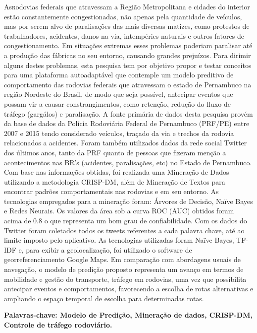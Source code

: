 \vspace*{12pt}

\lettrine {As} rodovias federais que atravessam a Região
Metropolitana e cidades do interior estão constantemente
congestionadas, não apenas pela quantidade de veículos,
mas por serem alvo de paralisações das mais diversas
matizes, como protestos de trabalhadores, acidentes,
danos na via, intempéries naturais e outros fatores de
congestionamento. Em situações extremas esses problemas
poderiam paralisar até a produção das fábricas no seu
entorno, causando grandes prejuízos. Para dirimir alguns
destes problemas, esta pesquisa tem por objetivo propor e testar conceitos 
para uma plataforma autoadaptável que contemple um modelo preditivo de comportamento das rodovias federais que
atravessam o estado de Pernambuco na região Nordeste do
Brasil, de modo que seja possível, antecipar eventos que
possam vir a causar constrangimentos, como retenção, redução do fluxo de tráfego (gargálos) e paralisação. 
A fonte primária de dados desta pesquisa provém da base de dados da Polícia 
Rodoviária Federal de Pernambuco (PRF/PE) entre 2007 e 2015 tendo considerado veículos, traçado da via e trechos da
rodovia relacionados a acidentes. Foram também utilizados dados da rede social Twitter dos últimos anos, tanto da PRF quanto de 
pessoas que fizeram menção a acontecimentos nas BR's (acidentes, paralisações, etc) no Estado de Pernambuco. 
Com base nas informações obtidas, foi realizada uma Mineração de Dados utilizando a metodologia CRISP-DM, além de Mineração de Textos para encontrar padrões comportamentais nas rodovias e em seu entorno. 
As tecnologias empregados para a mineração foram: Árvores de Decisão, Naïve Bayes e Redes Neurais. 
Os valores da área sob a curva ROC (AUC) obtidos foram
acima de 0.8 o que representa um bom grau de confiabilidade. Com os dados do Twitter foram coletados todos os tweets referentes a cada palavra chave, até ao limite imposto pelo aplicativo. As tecnologias utilizadas foram Naïve Bayes, TF-IDF e, para exibir a geolocalização, foi utilizado o software de georreferenciamento Google Maps.
Em comparação com abordagens usuais de navegação, o modelo de predição proposto representa um avanço em
termos de mobilidade e gestão do transporte, tráfego em rodovias, uma vez que possibilita antecipar eventos e
comportamentos, favorecendo a escolha de rotas alternativas e ampliando o espaço temporal de escolha para determinadas rotas. 


\par
\vspace{2em}
\noindent\textbf{Palavras-chave: Modelo de Predição, Mineração de dados, CRISP-DM, Controle de tráfego rodoviário.}